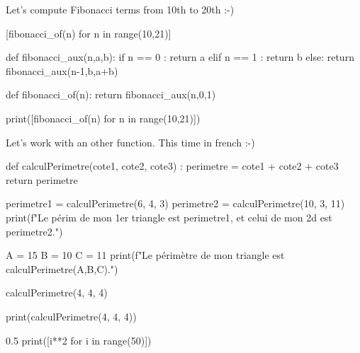 \documentclass[a4paper,11pt]{article}
\begin{document}
\begin{NotebookPitonRaw}{\linewidth}
Let’s compute Fibonacci terms from 10th to 20th :-)
\end{NotebookPitonRaw}

\begin{NotebookPitonIn}{\linewidth}
[fibonacci_of(n) for n in range(10,21)]
\end{NotebookPitonIn}

\begin{NotebookPitonConsole}{\linewidth}
def fibonacci_aux(n,a,b):
	if n == 0 :
		return a
	elif n == 1 :
		return b
	else:
		return fibonacci_aux(n-1,b,a+b)

def fibonacci_of(n):
	return fibonacci_aux(n,0,1)

print([fibonacci_of(n) for n in range(10,21)])
\end{NotebookPitonConsole}

\begin{NotebookPitonRaw}{\linewidth}
Let’s work with an other function.
This time in french :-)
\end{NotebookPitonRaw}

\begin{NotebookPitonInOut}{\linewidth}
def calculPerimetre(cote1, cote2, cote3) :
	perimetre = cote1 + cote2 + cote3
	return perimetre

perimetre1 = calculPerimetre(6, 4, 3)
perimetre2 = calculPerimetre(10, 3, 11)
print(f"Le périm de mon 1er triangle est {perimetre1}, et celui de mon 2d est {perimetre2}.")
\end{NotebookPitonInOut}

\begin{NotebookPitonInOut}{\linewidth}
A = 15
B = 10
C = 11
print(f"Le périmètre de mon triangle est {calculPerimetre(A,B,C)}.")
\end{NotebookPitonInOut}

\begin{NotebookPitonIn}{\linewidth}
calculPerimetre(4, 4, 4)
\end{NotebookPitonIn}

\begin{NotebookPitonConsole}{\linewidth}
print(calculPerimetre(4, 4, 4))
\end{NotebookPitonConsole}

\begin{NotebookPitonInOut}{0.5\linewidth}
print([i**2 for i in range(50)])
\end{NotebookPitonInOut}
\end{document}
